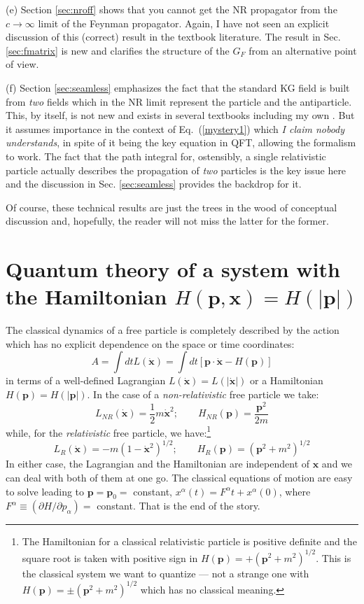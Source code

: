 \documentclass{article}
\def\eq#1{{Eq.~(\ref{#1})}}
\begin{document}
(e) Section \ref{sec:nroff} shows that you cannot get the NR propagator from the $c\to\infty$ limit of the Feynman propagator. Again, I have not seen an explicit discussion of this (correct) result in the textbook literature. The result in Sec. \ref{sec:fmatrix} is new and clarifies the structure of the $G_F$ from an alternative point of view.

(f) Section \ref{sec:seamless} emphasizes the fact that the standard KG field is built from \textit{two} fields which in the NR limit represent the particle and the antiparticle. This, by itself, is not new and exists in several textbooks including my own \cite{tpqft}. But it assumes importance in the context of \eq{mystery1} which \textit{I claim nobody understands}, in spite of it being  the key equation in QFT, allowing the formalism to work. The fact that the path integral for, ostensibly, a single relativistic particle actually describes the propagation of \textit{two} particles is the key issue here and the discussion in Sec. \ref{sec:seamless} provides the backdrop for it.

Of course, these technical results are just the trees in the wood of conceptual discussion and, hopefully, the reader will not miss the latter for the former.


\section{Quantum theory of a  system with the Hamiltonian $H(\bm{p},\bm{x})=H(|\bm{p}|)$}\label{sec:hofp}


The classical dynamics of a free  particle is completely described by the action which has no explicit dependence on the space or time coordinates:
 \begin{equation}
  A=\int dt L(\dot {\bm{x}})=\int dt[\bm{p}\cdot \dot{\bm{x}} -H(\bm{p})]
  \end{equation}
 in terms of  a well-defined Lagrangian $L(\dot {\bm{x}}) = L(|\dot{\bm{x}}|)$ or a Hamiltonian $H(\bm{p}) =H(|\bm{p}|) $. In the case of a \textit{non-relativistic} free particle we take:
  \begin{equation}
   L_{NR}(\dot{\bm{x}})= \frac{1}{2} m \dot{\bm{x}}^2; \qquad
  H_{NR}(\bm{p})=\frac{\bm{p}^2}{2m}
 \end{equation} 
 while, for the \textit{relativistic} free particle, we have:\footnote{The Hamiltonian for a classical relativistic particle is positive definite and  the square root is taken with positive sign in $H(\bm{p})=+(\bm{p}^2+m^2)^{1/2}$. This is the classical system we want to quantize --- not a strange one with $H(\bm{p})=\pm(\bm{p}^2+m^2)^{1/2}$ which has no classical meaning.}
  \begin{equation}
   L_{R}(\dot{\bm{x}})= - m (1-\dot{\bm{x}}^2)^{1/2}; \qquad
  H_{R}(\bm{p})=(\bm{p}^2+m^2)^{1/2}
 \end{equation} 
  In either case, the Lagrangian and the Hamiltonian  are independent of $\bm{x}$ and we can deal with both of them at one go. The classical equations of motion are easy to solve leading to $\bm{p}=\bm{p}_0=$ constant, $x^\alpha(t)={F}^\alpha t
  +x^\alpha(0)$,  where ${F}^\alpha\equiv (\partial {H}/\partial {p}_\alpha) = $ constant. That is the end of the story. 
\end{document}
